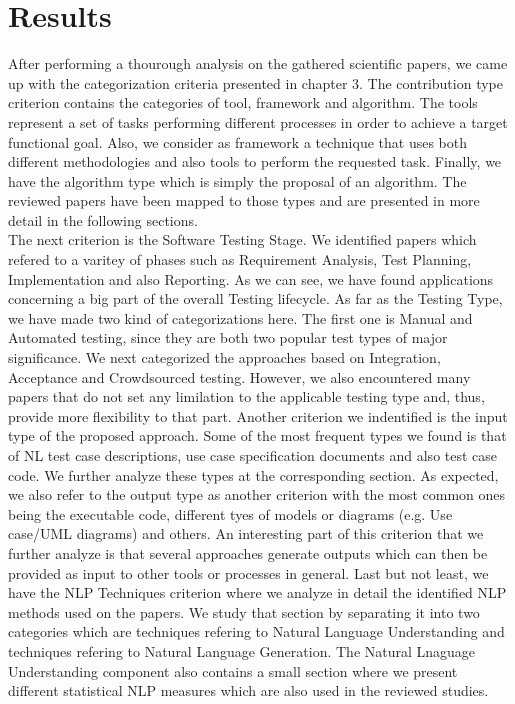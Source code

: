 \chapter{Results}

After performing a thourough analysis on the gathered scientific papers, we came up with the categorization criteria presented in chapter 3. The contribution type criterion contains the categories 
of tool, framework and algorithm. The tools represent a set of tasks performing different processes in order to achieve a target functional goal. Also, we consider as framework a technique
that uses both different methodologies and also tools to perform the requested task. Finally, we have the algorithm type which is simply the proposal of an algorithm. The reviewed papers have been 
mapped to those types and are presented in more detail in the following sections. \\

The next criterion is the Software Testing Stage. We identified papers which refered to a varitey of phases such as Requirement Analysis, Test Planning, Implementation and also 
Reporting. As we can see, we have found applications concerning a big part of the overall Testing lifecycle. As far as the Testing Type, we have made two kind of categorizations here. 
The first one is Manual and Automated testing, since they are both two popular test types of major significance. We next categorized the approaches based on Integration, Acceptance and Crowdsourced testing. 
However, we also encountered many papers that do not set any limilation to the applicable testing type and, thus, provide more flexibility to that part. Another criterion we indentified is the input type of 
the proposed approach. Some of the most frequent types we found is that of NL test case descriptions, use case specification documents and also test case code. We further analyze these types at the 
corresponding section. As expected, we also refer to the output type as another criterion with the most common ones being the executable code, different tyes of models or diagrams (e.g. Use case/UML diagrams) and 
others. An interesting part of this criterion that we further analyze is that several approaches generate outputs which can then be provided as input to other tools or processes in general. Last but not least, we 
have the NLP Techniques criterion where we analyze in detail the identified NLP methods used on the papers. We study that section by separating it into two categories which are techniques refering to Natural 
Language Understanding and techniques refering to Natural Language Generation. The Natural Lnaguage Understanding component also contains a small section where we present different statistical NLP measures which 
are also used in the reviewed studies.\\

